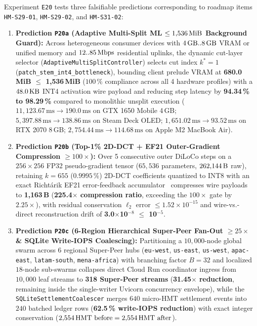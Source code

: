 \documentclass[11pt,a4paper]{article}
\begin{document}
Experiment \texttt{E20} tests three falsifiable predictions corresponding to roadmap items \texttt{HM-S29-01}, \texttt{HM-S29-02}, and \texttt{HM-S31-02}:
\begin{enumerate}[leftmargin=1.8em]
    \item \textbf{Prediction \texttt{P20a} (Adaptive Multi-Split ML $\le 1{,}536\text{\,MiB}$ Background Guard):} Across heterogeneous consumer devices with $4\text{\,GB}..8\text{\,GB}$ VRAM or unified memory and $12..85\text{\,Mbps}$ residential uplinks, the dynamic cut-layer selector (\texttt{AdaptiveMultiSplitController}) selects cut index $k^* = 1$ (\texttt{patch\_stem\_int4\_bottleneck}), bounding client prelude VRAM at \textbf{680.0\,MiB $\le$ 1{,}536\,MiB} ($100\,\%$ compliance across all 4 hardware profiles) with a $48.0\text{\,KB}$ INT4 activation wire payload and reducing step latency by \textbf{94.34\,\% to 98.29\,\%} compared to monolithic unsplit execution ($11{,}123.67\,\text{ms} \to 190.0\,\text{ms}$ on GTX 1650 Mobile 4\,GB; $5{,}397.88\,\text{ms} \to 138.86\,\text{ms}$ on Steam Deck OLED; $1{,}651.02\,\text{ms} \to 93.52\,\text{ms}$ on RTX 2070 8\,GB; $2{,}754.44\,\text{ms} \to 114.68\,\text{ms}$ on Apple M2 MacBook Air).
    \item \textbf{Prediction \texttt{P20b} (Top-1\% 2D-DCT + EF21 Outer-Gradient Compression $\ge 100\times$):} Over 5 consecutive outer DiLoCo steps on a $256 \times 256$ FP32 pseudo-gradient tensor ($65{,}536$ parameters, $262{,}144\text{\,B}$ raw), retaining $k = 655$ ($0.9995\,\%$) 2D-DCT coefficients quantized to INT8 with an exact Richt\'arik EF21 error-feedback accumulator~\cite{richtarik2021ef21} compresses wire payloads to \textbf{1{,}163\,B} (\textbf{225.4$\times$ compression ratio}, exceeding the $100\times$ gate by $2.25\times$), with residual conservation $\ell_2$ error $\le 1.52 \times 10^{-15}$ and wire-vs.-direct reconstruction drift of \textbf{3.0$\times$10$^{-8}$ $\le$ 10$^{-5}$}.
    \item \textbf{Prediction \texttt{P20c} (6-Region Hierarchical Super-Peer Fan-Out $\ge 25\times$ \& SQLite Write-IOPS Coalescing):} Partitioning a $10{,}000$-node global swarm across 6 regional Super-Peer hubs (\texttt{eu-west}, \texttt{us-east}, \texttt{us-west}, \texttt{apac-east}, \texttt{latam-south}, \texttt{mena-africa}) with branching factor $B = 32$ and localized $18$-node sub-swarms collapses direct Cloud Run coordinator ingress from $10{,}000$ leaf streams to \textbf{318 Super-Peer streams} (\textbf{31.45$\times$ reduction}, remaining inside the single-writer Uvicorn concurrency envelope), while the \texttt{SQLiteSettlementCoalescer} merges $640$ micro-HMT settlement events into $240$ batched ledger rows (\textbf{62.5\,\% write-IOPS reduction}) with exact integer conservation ($2{,}554\text{\,HMT before} = 2{,}554\text{\,HMT after}$).
\end{enumerate}
\end{document}
